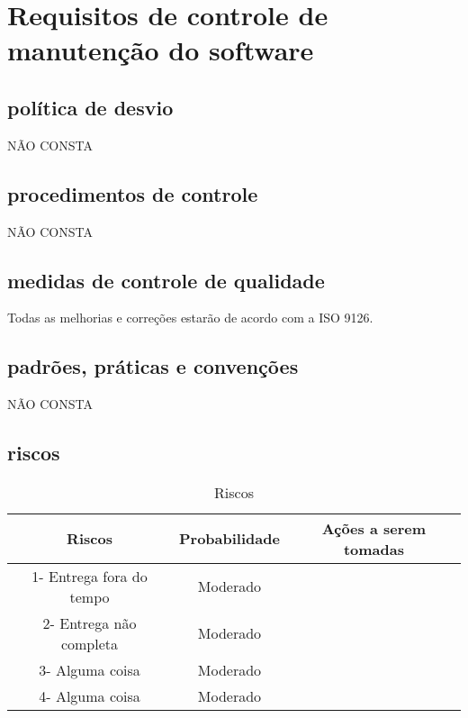 \chapter{Requisitos de controle de manutenção do software}

\section{política de desvio}
NÃO CONSTA
\section{procedimentos de controle}
NÃO CONSTA
\section{medidas de controle de qualidade}
Todas as melhorias e correções  estarão de acordo com a ISO 9126.
\section{padrões, práticas e convenções}
NÃO CONSTA
\section{riscos}
\begin{table}[!htb]
	\caption[Riscos]{Riscos}
	\label{tab:riscos}
	\centering
	\begin{tabular}{c|c|c}
		Riscos                           &  Probabilidade        &  Ações a serem tomadas	                          \\ \hline
		1- Entrega fora do tempo         &  Moderado             &                                                  \\
	  2- Entrega não completa          & 	Moderado	           &                                                  \\
    3- Alguma coisa                  & 	Moderado	           &                                                  \\
    4- Alguma coisa                  & 	Moderado	           &                                                  \\
	\end{tabular}
\end{table}

